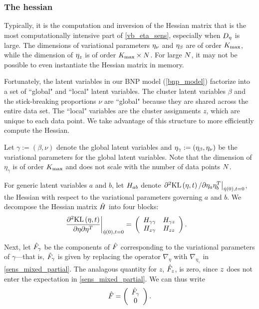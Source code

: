 \subsubsection*{The hessian}

Typically, it is the computation and inversion of the Hessian matrix that is
the most computationally intensive part of \eqref{vb_eta_sens}, especially when
${D_{\eta}}$ is large.
The dimensions of variational parameters $\eta_{\nu}$ and
$\eta_{\beta}$ are of order ${K_{\mathrm{max}}}$,
while the dimension of $\eta_{z}$ is of order ${K_{\mathrm{max}}}
\times N$.
For large $N$, it may not be possible to even instantiate the Hessian matrix in memory.

Fortunately, the latent variables in our BNP model (\eqref{bnp_model}) factorize
into a set of ``global" and ``local" latent variables.
The cluster latent variables $\beta$ and
the stick-breaking proportions $\nu$
are ``global" because they are shared across the entire data set.
The ``local" variables are the cluster assignments $z$, which are unique to each data point.
We take advantage of this structure to more efficiently compute the Hessian.

Let $\gamma := (\beta, \nu)$ denote the global latent variables and
$\eta_\gamma := (\eta_{\beta}, \eta_{\nu})$ be the variational parameters for the global latent variables.
Note that the dimension of $\eta_\gamma$ is of order ${K_{\mathrm{max}}}$ and does not scale with
the number of data points $N$.

For generic latent variables $a$ and $b$,
let $H_{ab}$ denote $\left.\partial^2 \mathrm{KL}\left(\eta, t\right) / \partial \eta_a
\eta_b^T\right|_{\hat\eta(0), t=0}$, the Hessian with respect to the variational
parameters governing $a$ and $b$.
We decompose the Hessian matrix $\hat{H}$ into four blocks:
%
\begin{align*}
%
\fracat{\partial^2 \KL{\eta, \t}}
       {\partial \eta \partial \eta^T}
       {\etaopt(0), t= 0} ={}&
\left(
\begin{array}{cc}
   \hess{\gamma\gamma} & \hess{\gamma\z} \\
   \hess{\z\gamma}     & \hess{\z\z} \\
\end{array}
\right).
%
\end{align*}

Next, let $\hat F_\gamma$ be the components of
$\hat F$ corresponding to the variational parameters of
$\gamma$---that is, $\hat F_\gamma$ is given by replacing
the operator $\nabla_\eta$ with $\nabla_{\eta_\gamma}$ in \eqref{sens_mixed_partial}.
The analagous quantity for $z$, $\hat F_z$, is zero, since $z$ does not enter the expectation in \eqref{sens_mixed_partial}.
We can thus write
\begin{align*}
  \hat F = \left( \begin{array}{c} \hat F_\gamma \\ 0 \end{array}\right).
\end{align*}

